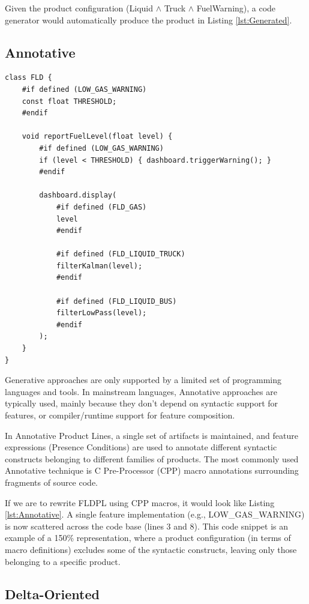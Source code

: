 \documentclass[11pt]{article}
\begin{document}
Given the product configuration (Liquid $\wedge$ Truck $\wedge$ FuelWarning), a code generator would automatically produce the product in Listing \ref{lst:Generated}.

\subsection{Annotative}

\begin{lstlisting}[caption=Annotative FLDPL, label={lst:Annotative}, float]
class FLD {
	#if defined (LOW_GAS_WARNING)
	const float THRESHOLD;
	#endif

	void reportFuelLevel(float level) {
		#if defined (LOW_GAS_WARNING)
		if (level < THRESHOLD) { dashboard.triggerWarning(); }
		#endif

		dashboard.display(
			#if defined (FLD_GAS)
			level
			#endif

			#if defined (FLD_LIQUID_TRUCK)
			filterKalman(level);
			#endif

			#if defined (FLD_LIQUID_BUS)
			filterLowPass(level);
			#endif
		);
	}
}
\end{lstlisting}

Generative approaches are only supported by a limited set of programming languages and tools. In mainstream languages, Annotative approaches are typically used, mainly because they don't depend on syntactic support for features, or compiler/runtime support for feature composition.

In Annotative Product Lines, a single set of artifacts is maintained, and feature expressions (Presence Conditions) are used to annotate different syntactic constructs belonging to different families of products. The most commonly used Annotative technique is C Pre-Processor (CPP) macro annotations surrounding fragments of source code.

If we are to rewrite FLDPL using CPP macros, it would look like Listing \ref{lst:Annotative}. A single feature implementation (e.g., LOW\_GAS\_WARNING) is now scattered across the code base (lines 3 and 8). This code snippet is an example of a 150\% representation, where a product configuration (in terms of macro definitions) excludes some of the syntactic constructs, leaving only those belonging to a specific product.

\subsection{Delta-Oriented}
\end{document}
